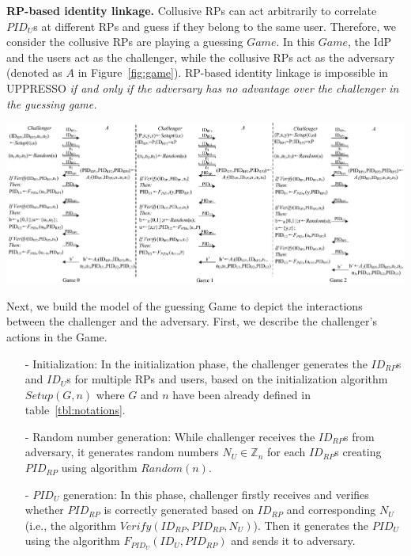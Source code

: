 \vspace{-2mm}
\noindent\textbf{RP-based identity linkage.} 
Collusive RPs can act arbitrarily to correlate $PID_U$s at different RPs and guess if they belong to the same user. Therefore, we consider the collusive RPs are playing a guessing $Game$. In this $Game$, the IdP and the users act as the challenger, while the collusive RPs act as the adversary (denoted as $A$ in Figure~\ref{fig:game}). RP-based identity linkage is impossible in UPPRESSO {\em if and only if the adversary has no advantage over the challenger in the guessing game.}

\vspace{1mm}
\begin{strip}
\centering\includegraphics[width=\textwidth, height=0.35\textheight]{fig/game.pdf}
\label{fig:game}
\vspace{-5mm}
\end{strip}

Next, we build the model of the guessing Game to depict the interactions between the challenger and the adversary. First, we describe the challenger's actions in the Game.

\begin{itemize}
\vspace{-\topsep}
\item[-] Initialization: In the initialization phase, the challenger generates the $ID_{RP}$s and $ID_U$s for multiple RPs and users, based on the initialization algorithm $Setup(G,n)$ where $G$ and $n$ have been already defined in table~\ref{tbl:notations}.
\vspace{-\topsep}
\item[-] Random number generation: While challenger receives the $ID_{RP}$s from adversary, it generates random numbers $N_U \in \mathbb{Z}_n$ for each $ID_{RP}$s creating $PID_{RP}$ using algorithm $Random(n)$.
\vspace{-\topsep}
\item[-] $PID_U$ generation: In this phase, challenger firstly receives and  verifies whether $PID_{RP}$ is correctly generated based on $ID_{RP}$ and corresponding $N_U$ (i.e., the algorithm $Verify(ID_{RP},PID_{RP},N_U)$). Then it generates the $PID_U$ using the algorithm $F_{PID_U}(ID_U,PID_{RP})$ and sends it to adversary.
\end{itemize}



